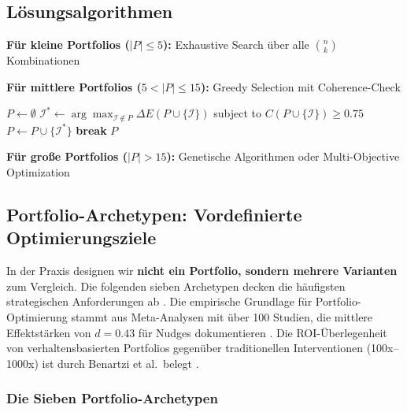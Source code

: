 \subsection{Lösungsalgorithmen}

\textbf{Für kleine Portfolios ($|P| \leq 5$):} Exhaustive Search über alle $\binom{n}{k}$ Kombinationen

\textbf{Für mittlere Portfolios ($5 < |P| \leq 15$):} Greedy Selection mit Coherence-Check

\begin{algorithm}[H]
\caption{Greedy Portfolio Construction}
\label{alg:20-greedy}
\begin{algorithmic}[1]
\State $P \leftarrow \emptyset$
    \State $\mathcal{I}^* \leftarrow \arg\max_{\mathcal{I} \notin P} \Delta E(P \cup \{\mathcal{I}\})$ subject to $C(P \cup \{\mathcal{I}\}) \geq 0.75$
        \State $P \leftarrow P \cup \{\mathcal{I}^*\}$
    \Else
        \State \textbf{break}
    \EndIf
\EndWhile
\State \Return $P$
\end{algorithmic}
\end{algorithm}

\textbf{Für große Portfolios ($|P| > 15$):} Genetische Algorithmen oder Multi-Objective Optimization


\subsection{Portfolio-Archetypen: Vordefinierte Optimierungsziele}
\label{sec:20-archetypes}

In der Praxis designen wir \textbf{nicht ein Portfolio, sondern mehrere Varianten} zum Vergleich. Die folgenden sieben Archetypen decken die häufigsten strategischen Anforderungen ab \citep{hummel2019effective, szaszi2018systematic}. Die empirische Grundlage für Portfolio-Optimierung stammt aus Meta-Analysen mit über 100 Studien, die mittlere Effektstärken von $d = 0.43$ für Nudges dokumentieren \citep{PAP-hummel2019effective}. Die ROI-Überlegenheit von verhaltensbasierten Portfolios gegenüber traditionellen Interventionen (100x--1000x) ist durch Benartzi et al.\ belegt \citep{benartzi2017should}.

\subsubsection{Die Sieben Portfolio-Archetypen}

